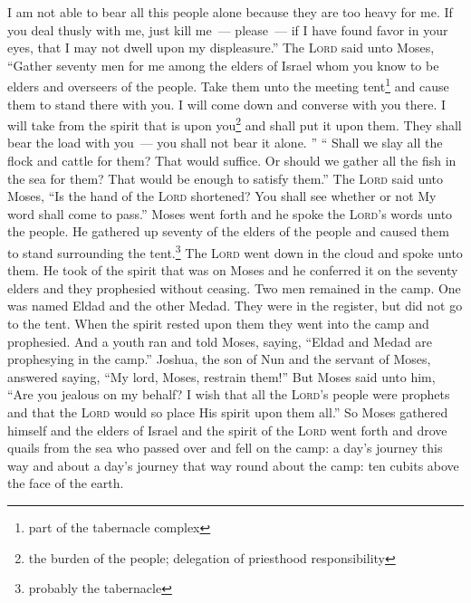 \begin{enumerate}[align=center]
     I am not able to bear all this people alone because they are too heavy for me.%
     If you deal thusly with me, just kill me~--- please~--- if I have found favor in your eyes, that I may not dwell upon my displeasure.''%
     The \textsc{Lord} said unto Moses, ``Gather seventy men for me among the elders of Israel whom you know to be elders and overseers of the people. Take them unto the meeting tent\footnote{part of the tabernacle complex} and cause them to stand there with you.%
     I will come down and converse with you there. I will take from the spirit that is upon you\footnote{the burden of the people; delegation of priesthood responsibility} and shall put it upon them. They shall bear the load with you~--- you shall not bear it alone.%
     ''%
     ``%
     Shall we slay all the flock and cattle for them? That would suffice. Or should we gather all the fish in the sea for them? That would be enough to satisfy them.''%
     The \textsc{Lord} said unto Moses, ``Is the hand of the \textsc{Lord} shortened? You shall see whether or not My word shall come to pass.''%
     Moses went forth and he spoke the \textsc{Lord}'s words unto the people. He gathered up seventy of the elders of the people and caused them to stand surrounding the tent.\footnote{probably the tabernacle}%
     The \textsc{Lord} went down in the cloud and spoke unto them. He took of the spirit that was on Moses and he conferred it on the seventy elders and they prophesied without ceasing.%
     Two men remained in the camp. One was named Eldad and the other Medad. They were in the register, but did not go to the tent. When the spirit rested upon them they went into the camp and prophesied.%
     And a youth ran and told Moses, saying, ``Eldad and Medad are prophesying in the camp.''%
     Joshua, the son of Nun and the servant of Moses, answered saying, ``My lord, Moses, restrain them!''%
     But Moses said unto him, ``Are you jealous on my behalf? I wish that all the \textsc{Lord}'s people were prophets and that the \textsc{Lord} would so place His spirit upon them all.''%
     So Moses gathered himself and the elders of Israel%
     and the spirit of the \textsc{Lord} went forth and drove quails from the sea who passed over and fell on the camp: a day's journey this way and about a day's journey that way round about the camp: ten cubits above the face of the earth.%

\end{enumerate}

